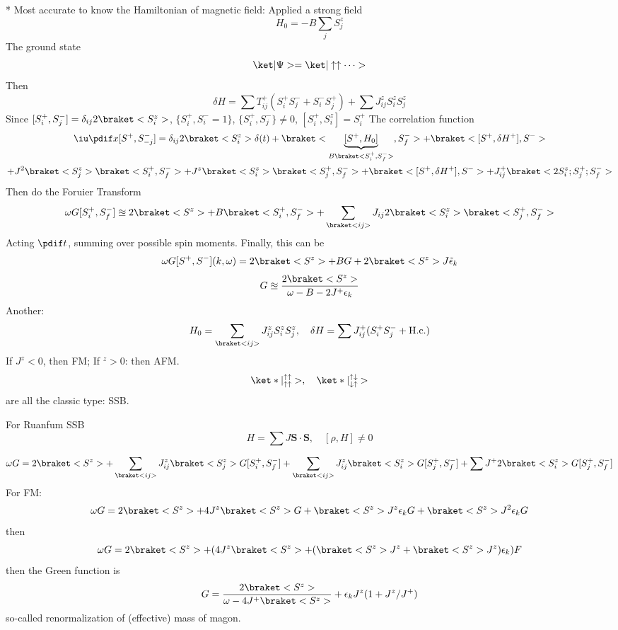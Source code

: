 * Most accurate to know the Hamiltonian of magnetic field: Applied a strong field
  \[
    H_0 = -B \sum_j S_j^z
  \]
  The ground state
  \[
    \ket|\Psi> = \ket|\uparrow\uparrow \cdots>
  \]
  Then
  \[
    \delta H = \sum T_{ij}^+ (S_i^+ S_j^- + S_i^- S_j^+) + \sum J_{ij}^z S_i^z S_j^z
  \]
  Since $[S_i^+, S_j^-] = \delta_{ij} 2\braket<S_i^z>$, $\{S_i^+, S_i^- = 1\}$, $\{S_i^+, S_j^-\} \neq 0$, $[S_i^+, S_i^z] = S_i^+$
  The correlation function
  \begin{multline*}
    \iu \pdif x [S^+, S_{-j}^-] = \delta_{ij}2\braket<S_i^z> \delta(t) + \braket<\underbrace{[S^+, H_0]}_{B\braket<S_i^+, S_f^->}, S_f^->
    + \braket<[S^+, \delta H^+], S^->\\
    + J^2 \braket<S_j^z> \braket<S_i^+, S_f^->
    + J^z \braket<S_i^z> \braket<S_j^+, S_f^->
    + \braket<[S^+, \delta H^+], S^->
    + J_{ij}^+ \braket<2S_i^z; S_j^+; S_f^->
  \end{multline*}
  Then do the Foruier Transform
  \[
    \omega G[S_i^+, S_f^-] \approxeq 2\braket<S^z> + B\braket<S_i^+, S_f^-> + \sum_{\braket<ij>} J_{ij} 2\braket<S_i^z> \braket<S_j^+, S_f^->
  \]
  Acting $\pdif t$, summing over possible spin moments.
  Finally, this can be
  \[
    \omega G[S^+, S^-](k, \omega) = 2\braket<S^z> + BG + 2\braket<S^z> J\tilde \epsilon_k
  \]
  \[
    G \approxeq \frac{2\braket<S^z>}{\omega - B - 2J^+ \epsilon_k}
  \]
  Another:
  \[
    H_0 = \sum_{\braket<ij>}J_{ij}^z S_i^z S_j^z, \quad
    \delta H = \sum J_{ij}^+ (S_i^+ S_j^- + \text{H.c.})
  \]
  If $J^z < 0$, then FM; If $^z > 0$: then AFM.
  \[
    \ket*|\substack{\uparrow \uparrow\\\uparrow \uparrow}>, \quad
    \ket*|\substack{\uparrow \downarrow\\\downarrow \uparrow}>
  \]
  are all the classic type: SSB.
  \begin{framed}
    For Ruanfum SSB
    \[
      H = \sum J \bm S \cdot \bm S, \quad [\rho, H] \neq 0
    \]
  \end{framed}
  \[
    \omega G = 2\braket<S^z> + \sum_{\braket<ij>} J_{ij}^z \braket<S_j^z> G[S_i^+, S_f^-]
  + \sum_{\braket<ij>} J_{ij}^z \braket<S_i^z> G[S_j^+, S_f^-]
  + \sum J^+ 2\braket<S_i^z> G[S_j^+, S_f^-]
  \]
  For FM:
  \[
    \omega G = 2\braket<S^z> + 4J^z \braket<S^z> G + \braket<S^z> J^z \epsilon_k G + \braket<S^z> J^2 \epsilon_k G
  \]
  then
  \[
    \omega G = 2\braket<S^z> + (4J^z \braket<S^z> + (\braket<S^z> J^z + \braket<S^z> J^z)\epsilon_k)F
  \]
  then the Green function is
  \[
    G = \frac{2\braket<S^z>}{\omega - 4J^+ \braket<S^z>} + \epsilon_k J^z (1 + J^z/J^+)
  \]
  so-called renormalization of (effective) mass of magon.

